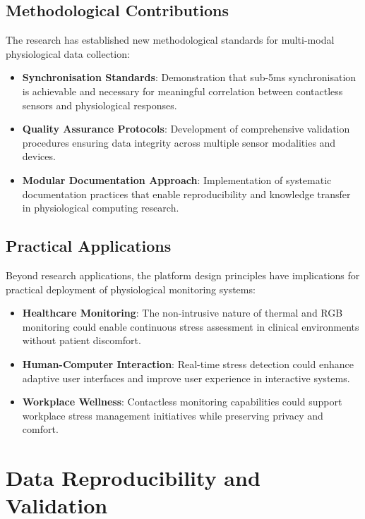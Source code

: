 \subsection{Methodological Contributions}

The research has established new methodological standards for multi-modal physiological data collection:

\begin{itemize}
\item \textbf{Synchronisation Standards}: Demonstration that sub-5ms synchronisation is achievable and necessary for meaningful correlation between contactless sensors and physiological responses.

\item \textbf{Quality Assurance Protocols}: Development of comprehensive validation procedures ensuring data integrity across multiple sensor modalities and devices.

\item \textbf{Modular Documentation Approach}: Implementation of systematic documentation practices that enable reproducibility and knowledge transfer in physiological computing research.
\end{itemize}

\subsection{Practical Applications}

Beyond research applications, the platform design principles have implications for practical deployment of physiological monitoring systems:

\begin{itemize}
\item \textbf{Healthcare Monitoring}: The non-intrusive nature of thermal and RGB monitoring could enable continuous stress assessment in clinical environments without patient discomfort.

\item \textbf{Human-Computer Interaction}: Real-time stress detection could enhance adaptive user interfaces and improve user experience in interactive systems.

\item \textbf{Workplace Wellness}: Contactless monitoring capabilities could support workplace stress management initiatives while preserving privacy and comfort.
\end{itemize}


\section{Data Reproducibility and Validation}

